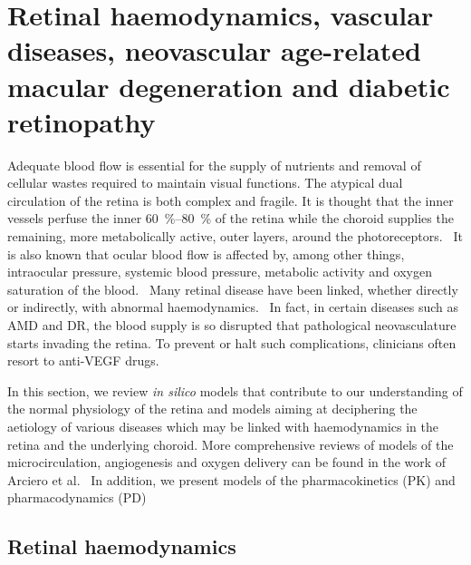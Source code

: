 \documentclass[12pt,a4paper]{journal}
\begin{document}
\section*{Retinal haemodynamics, vascular diseases, neovascular age-related macular degeneration and diabetic retinopathy}

Adequate blood flow is essential for the supply of nutrients and removal of cellular wastes required to maintain visual functions.
The atypical dual circulation of the retina is both complex and fragile.
It is thought that the inner vessels perfuse the inner \SIrange{60}{80}{\percent} of the retina while the choroid supplies the remaining, more metabolically active, outer layers, around the photoreceptors.~\cite{Birol_2007}
It is also known that ocular blood flow is affected by, among other things, intraocular pressure, systemic blood pressure, metabolic activity and oxygen saturation of the blood.~\cite{Birol_2007,McCullough_1997,Palkovits_2014,Polska_2007,Pournaras_2008,Riva_1997,Wang_2014}
Many retinal disease have been linked, whether directly or indirectly, with abnormal haemodynamics.~\cite{Hayreh_2004,Medina_2016}
In fact, in certain diseases such as AMD and DR, the blood supply is so disrupted that pathological neovasculature starts invading the retina.
To prevent or halt such complications, clinicians often resort to anti-VEGF drugs.

In this section, we review \textit{in silico} models that contribute to our understanding of the normal physiology of the retina and models aiming at deciphering the aetiology of various diseases which may be linked with haemodynamics in the retina and the underlying choroid.
More comprehensive reviews of models of the microcirculation, angiogenesis and oxygen delivery can be found in the work of Arciero et al.~\cite{Arciero_2017, Arciero_2019}
In addition, we present models of the pharmacokinetics (PK) and pharmacodynamics (PD)


\subsection*{Retinal haemodynamics}
\end{document}

